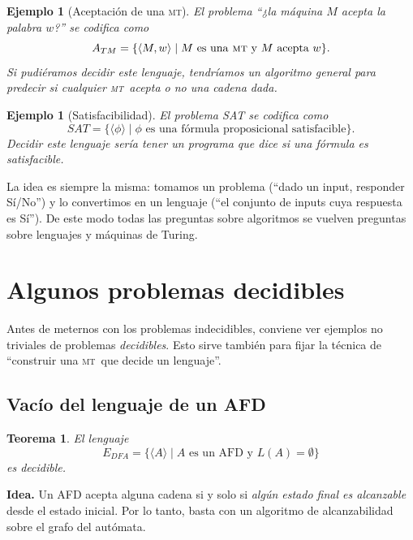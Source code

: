 \documentclass[11pt,a4paper]{article}
\theoremstyle{definicion}
\newtheorem{teorema}[definicion]{Teorema}
\newtheorem{ejemplo}[definicion]{Ejemplo}
\newcommand{\MT}{\textsc{mt}}
\newcommand{\enc}[1]{\langle #1 \rangle}
\begin{document}
\begin{ejemplo}[Aceptación de una \MT]
El problema ``¿la máquina $M$ acepta la palabra $w$?'' se codifica como
\[
A_{TM} = \{ \enc{M, w} \mid M \text{ es una \MT\ y } M \text{ acepta } w\}.
\]
Si pudiéramos decidir este lenguaje, tendríamos un algoritmo general para predecir si cualquier \MT\ acepta o no una cadena dada.
\end{ejemplo}

\begin{ejemplo}[Satisfacibilidad]
El problema SAT se codifica como
\[
SAT = \{ \enc{\phi} \mid \phi \text{ es una fórmula proposicional satisfacible} \}.
\]
Decidir este lenguaje sería tener un programa que dice si una fórmula es satisfacible.
\end{ejemplo}

\begin{intuicion}
La idea es siempre la misma: tomamos un problema (``dado un input, responder Sí/No'') y lo convertimos en un lenguaje (``el conjunto de inputs cuya respuesta es Sí''). De este modo todas las preguntas sobre algoritmos se vuelven preguntas sobre lenguajes y máquinas de Turing.
\end{intuicion}

\section{Algunos problemas decidibles}

Antes de meternos con los problemas indecidibles, conviene ver ejemplos no triviales de problemas \emph{decidibles}. Esto sirve también para fijar la técnica de ``construir una \MT\ que decide un lenguaje''.

\subsection{Vacío del lenguaje de un AFD}

\begin{teorema}
El lenguaje
\[
E_{DFA} = \{ \enc{A} \mid A \text{ es un AFD y } L(A) = \emptyset \}
\]
es decidible.
\end{teorema}

\textbf{Idea.} Un AFD acepta alguna cadena si y solo si \emph{algún estado final es alcanzable} desde el estado inicial. Por lo tanto, basta con un algoritmo de alcanzabilidad sobre el grafo del autómata.
\end{document}
